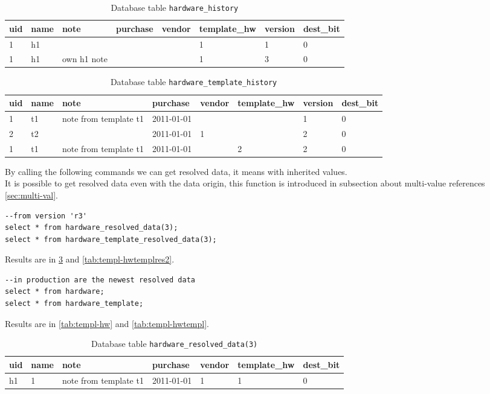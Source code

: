 \documentclass[deska]{subfiles}
\begin{document}
\begin{longtable}{ l | l | l | l | l | l | l | l }
    \caption{Database table {\tt hardware\_history}}
    \label{tab:templ-hwhist} \\
    uid & name & note & purchase & vendor & template\_hw & version & dest\_bit\\
    \hline
    \endhead
    1 & h1 &  &  &  & 1 & 1 & 0\\
    1 & h1 & own h1 note &  &  & 1 & 3 & 0\\
    \hline
\end{longtable}

\begin{longtable}{ l | l | l | l | l | l | l | l }
    \caption{Database table {\tt hardware\_template\_history}}
    \label{tab:templ-hwtemplhist} \\
    uid & name & note & purchase & vendor & template\_hw & version & dest\_bit\\
    \hline
    \endhead
    1 & t1 & note from template t1 & 2011-01-01 &  &  & 1 & 0\\
    2 & t2 &  & 2011-01-01 & 1 &  & 2 & 0\\
    1 & t1 & note from template t1 & 2011-01-01 &  & 2 & 2 & 0\\
    \hline
\end{longtable}


By calling the following commands we can get resolved data, it means with inherited values.\\
It is possible to get resolved data even with the data origin, this function is introduced in subsection about multi-value references \ref{sec:multi-val}.
\begin{verbatim}
--from version 'r3'
select * from hardware_resolved_data(3);
select * from hardware_template_resolved_data(3);
\end{verbatim}

Results are in \ref{tab:templ-hwres2} and \ref{tab:templ-hwtemplres2}.

\begin{verbatim}
--in production are the newest resolved data
select * from hardware;
select * from hardware_template;
\end{verbatim}
Results are in \ref{tab:templ-hw} and \ref{tab:templ-hwtempl}.

\begin{longtable}{ l | l | l | l | l | l | l }
    \caption{Database table {\tt hardware\_resolved\_data(3)}}
    \label{tab:templ-hwres2} \\
    uid & name & note & purchase & vendor & template\_hw & dest\_bit\\
    \hline
    \endhead
    h1 & 1 & note from template t1 & 2011-01-01 & 1 & 1 & 0\\
    \hline
\end{longtable}
\end{document}
